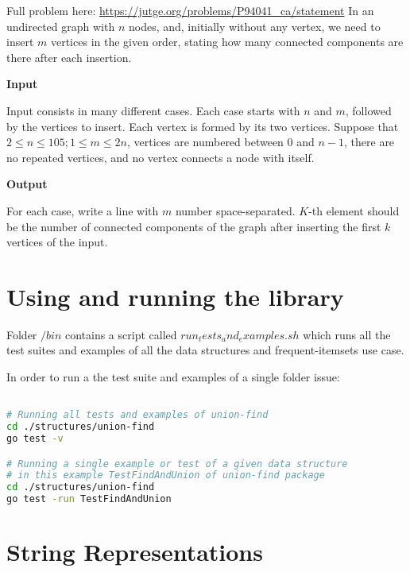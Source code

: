 \documentclass[a4paper,10pt,table,xcdraw]{article}
\begin{document}
\begin{appendices}
Full problem here: \url{https://jutge.org/problems/P94041\_ca/statement}
In an undirected graph with $n$ nodes, and, initially without any vertex, we need to insert $m$ vertices in the given order, stating how many connected components are there after each insertion.

\textbf{Input}

Input consists in many different cases. Each case starts with $n$ and $m$, followed by the vertices to insert. Each vertex is formed by its two vertices. Suppose that $2 \leq n \leq 105; 1 \leq m \leq 2n$, vertices are numbered between $0$ and $n-1$, there are no repeated vertices, and no vertex connects a node with itself.

\textbf{Output}

For each case, write a line with $m$ number space-separated. $K$-th element should be the number of connected components of the graph after inserting the first $k$ vertices of the input.



\section{Using and running the library}


\label{app:3}

Folder $/bin$ contains a script called $run_tests_and_examples.sh$ which runs all the test suites and examples of all the data structures and frequent-itemsets use case. 

In order to run a the test suite and examples of a single folder issue:


\begin{lstlisting}[language=bash,caption={Run tests and examples of a of union-find in verbose mode (-v)}, label=lst:tests]

# Running all tests and examples of union-find
cd ./structures/union-find
go test -v

# Running a single example or test of a given data structure
# in this example TestFindAndUnion of union-find package
cd ./structures/union-find
go test -run TestFindAndUnion
\end{lstlisting}

\section{String Representations}
\label{sec:visual}



\end{appendices}
\end{document}
